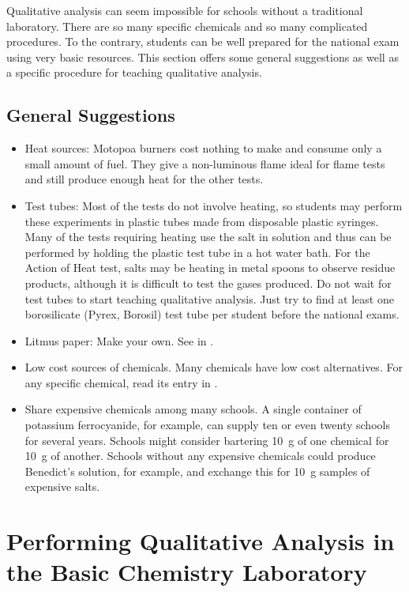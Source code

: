 Qualitative analysis can seem impossible for schools 
without a traditional laboratory. 
There are so many specific chemicals 
and so many complicated procedures. 
To the contrary, 
students can be well prepared for the national exam 
using very basic resources. 
This section offers some general suggestions as well as 
a specific procedure for teaching qualitative analysis.

\subsection{General Suggestions}
\begin{itemize}
\item{Heat sources: Motopoa burners 
cost nothing to make and consume only a small amount of fuel. 
They give a non-luminous flame ideal for flame tests 
and still produce enough heat for the other tests.}
\item{Test tubes: Most of the tests do not involve heating, 
so students may perform these experiments in plastic tubes 
made from disposable plastic syringes. 
Many of the tests requiring heating use the salt in solution 
and thus can be performed 
by holding the plastic test tube in a hot water bath.
For the Action of Heat test, 
salts may be heating in metal spoons to observe residue products, 
although it is difficult to test the gases produced. 
Do not wait for test tubes to start teaching qualitative analysis. 
Just try to find at least one borosilicate (Pyrex, 
Borosil) test tube per student before the national exams.}
\item{Litmus paper: Make your own. 
See  in .}
\item{Low cost sources of chemicals. 
Many chemicals have low cost alternatives. 
For any specific chemical, 
read its entry in .}
\item{Share expensive chemicals among many schools. 
A single container of potassium ferrocyanide, 
for example, 
can supply ten or even twenty schools for several years. 
Schools might consider bartering 10~g of one chemical for 10~g of another. 
Schools without any expensive chemicals could produce Benedict's solution, for example, and exchange this for 10~g samples of expensive salts.}
\end{itemize} 
 
\section{Performing Qualitative Analysis in the Basic Chemistry Laboratory}

